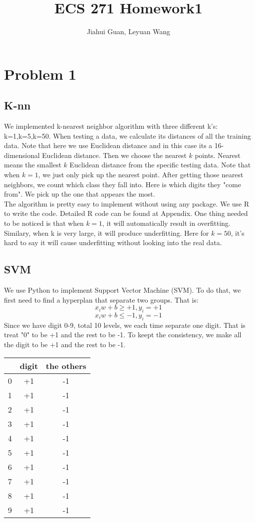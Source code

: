 \documentclass{article}
\title{ECS 271 Homework1}
\date{\vspace{-5ex}}
\begin{document}
\author{Jiahui Guan, Leyuan Wang}
\maketitle


\section{Problem 1} 
\subsection{K-nn}
We implemented k-nearest neighbor algorithm with three different k's: k=1,k=5,k=50. When testing a data, we calculate its distances of all the training data. Note that here we use Euclidean distance and in this case its a 16-dimensional Euclidean distance. Then we choose the nearest $k$ points. Nearest means the smallest $k$ Euclidean distance from the specific testing data. Note that when $k=1$, we just only pick up the nearest point. After getting those nearest neighbors, we count which class they fall into. Here is which digits they "come from". We pick up the one that appears the most. \\

The algorithm is pretty easy to implement without using any package. We use R to write the code. Detailed R code can be found at Appendix. One thing needed to be noticed is that when $k=1$, it will automatically result in overfitting. Similary, when k is very large, it will produce underfitting. Here for $k=50$, it's hard to say it will cause underfitting without looking into the real data.\\

\subsection{SVM}
We use Python to implement Support Vector Machine (SVM). To do that, we first need to find a hyperplan that separate two groups. That is: 
\[x_iw+b \geq +1, y_i=+1\]
\[x_iw+b \leq -1 , y_i=-1\]
Since we have digit 0-9, total 10 levels, we each time separate one digit. That is treat "0" to be +1 and the rest to be -1. To keept the consistency, we make all the digit to be +1 and the rest to be -1. 

\begin{table}[H]
\centering
\begin{tabular}{|c|c|c|}
\hline
& digit & the others\\
\hline
\hline 
0&+1&-1\\
1&+1&-1\\
2&+1&-1\\
3&+1&-1\\
4&+1&-1\\
5&+1&-1\\
6&+1&-1\\
7&+1&-1\\
8&+1&-1\\
9&+1&-1\\
\hline
\end{tabular}

\end{table}
\end{document}
